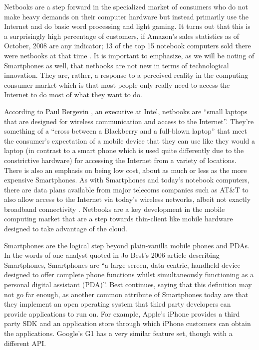 Netbooks are a step forward in the specialized market of consumers who do not
make heavy demands on their computer hardware but instead primarily use the
Internet and do basic word processing and light gaming.  It turns out that this
is a surprisingly high percentage of customers, if Amazon's sales statistics as
of October, 2008 are any indicator; 13 of the top 15 notebook computers sold
there were netbooks at that time \citep{copeland2008}.  It is important to
emphasize, as we will be noting of Smartphones as well, that netbooks are not
new in terms of technological innovation.  They are, rather, a response to a
perceived reality in the computing consumer market which is that most people
only really need to access the Internet to do most of what they want to do.

According to Paul Bergevin \citeyearpar{bergevin2008}, an executive at Intel,
netbooks are ``small laptops that are designed for wireless communication and
access to the Internet''.  They're something of a ``cross between a Blackberry
and a full-blown laptop'' \citep{copeland2008} that meet the consumer's
expectation of a mobile device that they can use like they would a laptop (in
contrast to a smart phone which is used quite differently due to the
constrictive hardware) for accessing the Internet from a variety of locations.
There is also an emphasis on being low cost, about as much or less as the more
expensive Smartphones.  As with Smartphones and today's notebook computers,
there are data plans available from major telecoms companies such as AT\&T to
also allow access to the Internet via today's wireless networks, albeit not
exactly broadband connectivity \citep{ap2009}.  Netbooks are a key development
in the mobile computing market that are a step towards thin-client like mobile
hardware designed to take advantage of the cloud.

Smartphones are the logical step beyond plain-vanilla mobile phones and PDAs.
In the words of one analyst quoted in Jo Best's 2006 article describing
Smartphones, Smartphones are ``a large-screen, data-centric, handheld device
designed to offer complete phone functions whilst simultaneously functioning as
a personal digital assistant (PDA)''.  Best continues, saying that this
definition may not go far enough, as another common attribute of Smartphones
today are that they implement an open operating system that third party
developers can provide applications to run on.  For example, Apple's iPhone
provides a third party SDK and an application store through which iPhone
customers can obtain the applications.  Google's G1 has a very similar feature
set, though with a different API.

